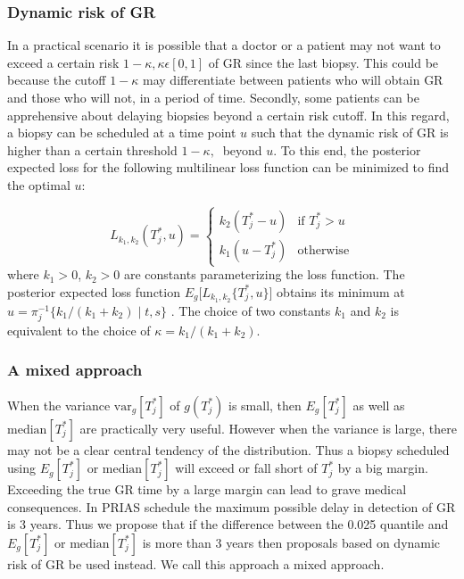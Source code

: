 \subsubsection{Dynamic risk of GR}
\label{subsubsec : dynamic_risk_definitions}
In a practical scenario it is possible that a doctor or a patient may not want to exceed a certain risk $1 - \kappa, \kappa \epsilon [0,1]$ of GR since the last biopsy. This could be because the cutoff $1 - \kappa$ may differentiate between patients who will obtain GR and those who will not, in a period of time. Secondly, some patients can be apprehensive about delaying biopsies beyond a certain risk cutoff. In this regard, a biopsy can be scheduled at a time point $u$ such that the dynamic risk of GR is higher than a certain threshold $1 - \kappa,\ $ beyond $u$. To this end, the posterior expected loss for the following multilinear loss function can be minimized to find the optimal $u$:

\begin{equation}
\label{eq : loss_dynamic_risk}
L_{k_1, k_2}(T^*_j, u) =
    \begin{cases}
      k_2(T^*_j-u) & \text{if } T^*_j > u\\
      k_1(u-T^*_j) & \text{otherwise}
    \end{cases}       
\end{equation}
where $k_1 > 0$, $k_2 > 0$ are constants parameterizing the loss function. The posterior expected loss function $E_g\big[L_{k_1, k_2}\{T^*_j, u\}\big]$ obtains its minimum at $u = \pi_j^{-1}\big\{k_1/{(k_1 + k_2)} \mid t,s \big\}$ \citep{robertBayesianChoice}. The choice of two constants $k_1$ and $k_2$ is equivalent to the choice of $\kappa = {k_1}/{(k_1 + k_2)}$.

\subsubsection{A mixed approach}
\label{subsubsec : mixed_approach}
 When the variance $\mbox{var}_g[T^*_j]$ of $g(T^*_j)$ is small, then $E_g[T^*_j]$ as well as $\mbox{median}[T^*_j]$ are practically very useful. However when the variance is large, there may not be a clear central tendency of the distribution. Thus a biopsy scheduled using $E_g[T^*_j]$ or $\mbox{median}[T^*_j]$ will exceed or fall short of $T^*_j$ by a big margin. Exceeding the true GR time by a large margin can lead to grave medical consequences. In PRIAS schedule the maximum possible delay in detection of GR is 3 years. Thus we propose that if the difference between the 0.025 quantile and $E_g[T^*_j]$ or $\mbox{median}[T^*_j]$ is more than 3 years then proposals based on dynamic risk of GR be used instead. We call this approach a mixed approach.